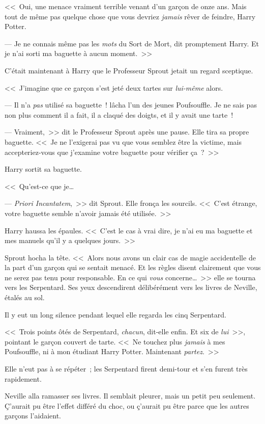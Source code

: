 <<~Oui, une menace vraiment terrible venant d'un garçon de onze ans. Mais tout de même pas quelque chose que vous devriez \emph{jamais} rêver de feindre, Harry Potter.

--- Je ne connais même pas les \emph{mots} du Sort de Mort, dit promptement Harry. Et je n'ai sorti ma baguette à aucun moment.~>>

C'était maintenant à Harry que le Professeur Sprout jetait un regard sceptique.

<<~J'imagine que ce garçon s'est jeté deux tartes sur \emph{lui-même} alors.

--- Il n'a \emph{pas} utilisé sa baguette~! lâcha l'un des jeunes Poufsouffle. Je ne sais pas non plus comment il a fait, il a claqué des doigts, et il y avait une tarte~!

--- Vraiment,~>> dit le Professeur Sprout après une pause. Elle tira sa propre baguette. <<~Je ne l'exigerai pas vu que vous semblez être la victime, mais accepteriez-vous que j'examine votre baguette pour vérifier ça~?~>>

Harry sortit sa baguette.

<<~Qu'est-ce que je…

--- \emph{Priori Incantatem},~>> dit Sprout. Elle fronça les sourcils. <<~C'est étrange, votre baguette semble n'avoir jamais été utilisée.~>>

Harry haussa les épaules. <<~C'est le cas à vrai dire, je n'ai eu ma baguette et mes manuels qu'il y a quelques jours.~>>

Sprout hocha la tête. <<~Alors nous avons un clair cas de magie accidentelle de la part d'un garçon qui se sentait menacé. Et les règles disent clairement que vous ne serez pas tenu pour responsable. En ce qui \emph{vous} concerne…~>> elle se tourna vers les Serpentard. Ses yeux descendirent délibérément vers les livres de Neville, étalés au sol.

Il y eut un long silence pendant lequel elle regarda les cinq Serpentard.

<<~Trois points ôtés de Serpentard, \emph{chacun}, dit-elle enfin. Et six de \emph{lui}~>>, pointant le garçon couvert de tarte. <<~Ne touchez plus \emph{jamais} à mes Poufsouffle, ni à mon étudiant Harry Potter. Maintenant \emph{partez}.~>>

Elle n'eut pas à se répéter~; les Serpentard firent demi-tour et s'en furent très rapidement.

Neville alla ramasser ses livres. Il semblait pleurer, mais un petit peu seulement. Ç'aurait pu être l'effet différé du choc, ou ç'aurait pu être parce que les autres garçons l'aidaient.

